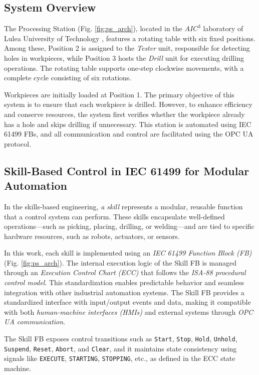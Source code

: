 \begin{bibunit}
    \subsection{System Overview}
    The Processing Station (Fig. \ref{fig:ps_arch}), located in the $AIC^3$ laboratory of Lulea University of Technology \cite{aiccubelab}, features a rotating table with six fixed positions. Among these, Position 2 is assigned to the \textit{Tester} unit, responsible for detecting holes in workpieces, while Position 3 hosts the \textit{Drill} unit for executing drilling operations. The rotating table supports one-step clockwise movements, with a complete cycle consisting of six rotations.
    
    Workpieces are initially loaded at Position 1. The primary objective of this system is to ensure that each workpiece is drilled. However, to enhance efficiency and conserve resources, the system first verifies whether the workpiece already has a hole and skips drilling if unnecessary. This  station is automated using IEC 61499 FBs, and all communication and control are facilitated using the OPC UA protocol.
    
    
    \subsection{Skill-Based Control in IEC 61499 for Modular Automation}
    
    In the skills-based engineering, \textit{a skill} represents a modular, reusable function that a control system can perform. These skills encapsulate well-defined operations—such as picking, placing, drilling, or welding—and are tied to specific hardware resources, such as robots, actuators, or sensors. 
    
    In this work, each skill is implemented using an \textit{IEC 61499 Function Block (FB)} (Fig. \ref{fig:ps_arch}). The internal execution logic of the Skill FB is managed through an \textit{Execution Control Chart (ECC)} that follows the \textit{ISA-88 procedural control model}. This standardization enables predictable behavior and seamless integration with other industrial automation systems. The Skill FB provides a standardized interface with input/output events and data, making it compatible with both \textit{human-machine interfaces (HMIs)} and external systems through \textit{OPC UA communication}.
    
    The Skill FB exposes control transitions such as \texttt{Start}, \texttt{Stop}, \texttt{Hold}, \texttt{Unhold}, \texttt{Suspend}, \texttt{Reset}, \texttt{Abort}, and \texttt{Clear}, and it maintains state consistency using signals like \texttt{EXECUTE}, \texttt{STARTING}, \texttt{STOPPING}, etc., as defined in the ECC state machine.
    

\end{bibunit}
